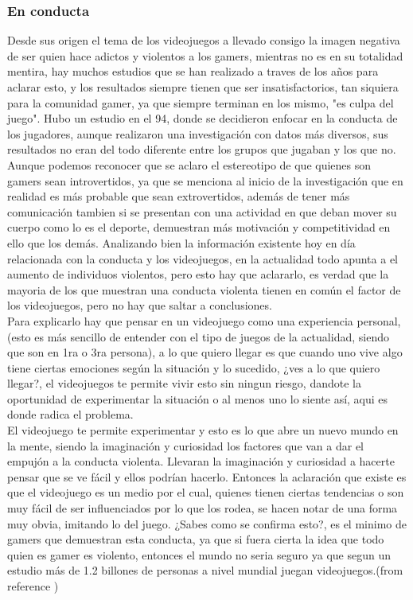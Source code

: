 \documentclass{bmcart}
\begin{document}
\subsubsection*{En conducta}
Desde sus origen el tema de los videojuegos a llevado consigo la imagen negativa de ser quien hace adictos y violentos a los gamers, mientras no es en su totalidad mentira, hay muchos estudios que se han realizado a traves de los años para aclarar esto, y los resultados siempre tienen que ser insatisfactorios, tan siquiera para la comunidad gamer, ya que siempre terminan en los mismo, "es culpa del juego".
\newline
Hubo un estudio en el 94, donde se decidieron enfocar en la conducta de los jugadores, aunque realizaron una investigación con datos más diversos, sus resultados no eran del todo diferente entre los grupos que jugaban y los que no. Aunque podemos reconocer que se aclaro el estereotipo de que quienes son gamers sean introvertidos, ya que se menciona al inicio de la investigación que en realidad es más probable que sean extrovertidos, además de tener más comunicación tambien si se presentan con una actividad en que deban mover su cuerpo como lo es el deporte, demuestran más motivación y competitividad en ello que los demás.\cite{marti1994videojuegos}
\newline
\newline
Analizando bien la información existente hoy en día relacionada con la conducta y los videojuegos, en la actualidad todo apunta a el aumento de individuos violentos, pero esto hay que aclararlo, es verdad que la mayoria de los que muestran una conducta violenta tienen en común el factor de los videojuegos, pero no hay que saltar a conclusiones.\\
Para explicarlo hay que pensar en un videojuego como una experiencia personal,(esto es más sencillo de entender con el tipo de juegos de la actualidad, siendo que son en 1ra o 3ra persona), a lo que quiero llegar es que cuando uno vive algo tiene ciertas emociones según la situación y lo sucedido, ¿ves a lo que quiero llegar?, el videojuegos te permite vivir esto sin ningun riesgo, dandote la oportunidad de experimentar la situación o al menos uno lo siente así, aqui es donde radica el problema.\\
El videojuego te permite experimentar y esto es lo que abre un nuevo mundo en la mente, siendo la imaginación y curiosidad los factores que van a dar el empujón a la conducta violenta. Llevaran la imaginación y curiosidad a hacerte pensar que se ve fácil y ellos podrían hacerlo. Entonces la aclaración que existe es que el videojuego es un medio por el cual, quienes tienen ciertas tendencias o son muy fácil de ser influenciados por lo que los rodea, se hacen notar de una forma muy obvia, imitando lo del juego. ¿Sabes como se confirma esto?, es el minimo de gamers que demuestran esta conducta, ya que si fuera cierta la idea que todo quien es gamer es violento, entonces el mundo no seria seguro ya que segun un estudio más de 1.2 billones de personas a nivel mundial juegan videojuegos.(from reference \cite{population})
\end{document}
